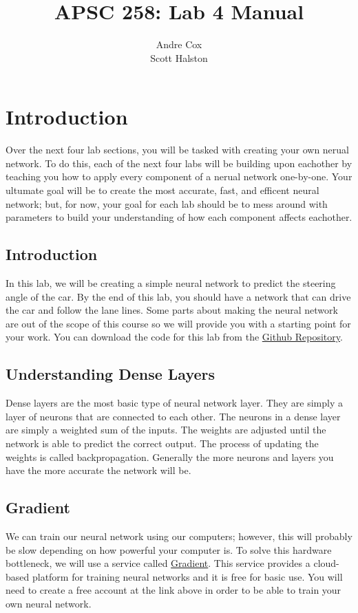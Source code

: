 \documentclass[11pt]{report}
\title{APSC 258: Lab 4 Manual}
\author{Andre Cox \\ Scott Halston}
\begin{document}
\maketitle
\tableofcontents

\clearpage

\chapter{Introduction}
Over the next four lab sections, you will be tasked with creating your own nerual network. To do this, each of the next four labs will be building upon eachother by teaching you how to apply every component of a nerual network one-by-one. Your ultumate goal will be to create the most accurate, fast, and efficent neural network; but, for now, your goal for each lab should be to mess around with parameters to build your understanding of how each component affects eachother.

\section{Introduction}
In this lab, we will be creating a simple neural network to predict the steering angle of the car.
By the end of this lab, you should have a network that can drive the car and follow the lane lines. Some parts about making the neural network are out of the scope of this course so we will provide you with a starting point for your work. You can download the code for this lab from the 
\href{https://github.com/PiCarV/Demos}{Github Repository}.

\section{Understanding Dense Layers}
Dense layers are the most basic type of neural network layer. They are simply a layer of neurons that are connected to each other. The neurons in a dense layer are simply a weighted sum of the inputs. The weights are adjusted until the network is able to predict the correct output. The process of updating the weights is called backpropagation. Generally the more neurons and layers you have the more accurate the network will be. 

\section{Gradient}
We can train our neural network using our computers; however, this will probably be slow depending on how powerful your computer is. To solve this hardware bottleneck, we will use a service called \href{https://www.gradient.run/}{Gradient}. This service provides a cloud-based platform for training neural networks and it is free for basic use. You will need to create a free account at the link above in order to be able to train your own neural network.
\end{document}
